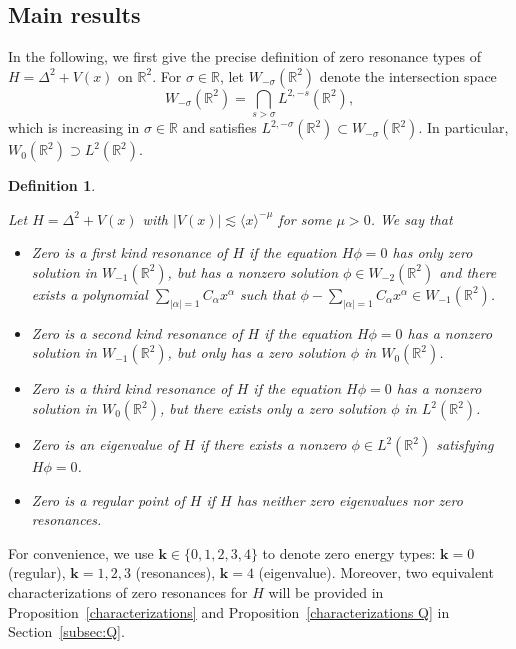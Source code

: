 \documentclass[reqno]{amsart}
\newtheorem{definition}[theorem]{Definition}
\newcommand\R{\mathbb{R}}
\numberwithin{equation}{section}
\begin{document}
	\subsection{Main results}\label{main result}
  In the following, we first give the precise definition of zero resonance types of $H=\Delta^2+V(x)$ on $\mathbb{R}^2$.
For $\sigma \in \mathbb{R}$, let $W_{-\sigma}\left(\mathbb{R}^2\right)$ denote the intersection space
$$
W_{-\sigma}\left(\mathbb{R}^2\right)=\bigcap_{s>\sigma} L^{2,-s}\left(\mathbb{R}^2\right) ,
$$
which is increasing in $\sigma\in\R$ and satisfies $L^{2,-\sigma}(\mathbb{R}^2) \subset W_{-\sigma}(\mathbb{R}^2)$. In particular, $W_0\left(\mathbb{R}^2\right) \supset L^2\left(\mathbb{R}^2\right)$.
\begin{definition}\label{definition1}
{\rm Let $H = \Delta^2 + V(x)$ with $|V(x)| \lesssim \langle x \rangle^{-\mu}$ for some $\mu > 0$. We say that
\begin{itemize}
\item[(i)] Zero is a {\it first kind resonance}  of $H$ if the equation $H\phi = 0$  has only zero solution  in $W_{-1}(\mathbb{R}^2)$, but has a nonzero solution  $\phi \in W_{-2}(\mathbb{R}^2)$ and there exists a polynomial $\sum_{|\alpha|=1} C_\alpha x^\alpha$ such that $\phi-\sum_{|\alpha|=1} C_\alpha x^\alpha\in W_{-1}(\mathbb{R}^2)$.  
\vskip0.1cm

\item[(ii)] Zero is a {\it second kind resonance} of $H$ if
the equation $H\phi = 0$ has a nonzero solution  in $W_{-1}(\mathbb{R}^2)$, but only has a zero solution  $\phi$ in $W_{0}(\mathbb{R}^2)$.
\vskip0.1cm

\item[(iii)] Zero is a {\it third kind resonance} of $H$ if the equation $H\phi = 0$ has a nonzero solution  in $W_0(\mathbb{R}^2)$, but there exists only a zero solution  $\phi$ in  $L^2(\mathbb{R}^2)$.

\vskip0.1cm
\item[(iv)] Zero is an \emph{eigenvalue}  of $H$ if there exists a nonzero $\phi \in L^2(\mathbb{R}^2)$ satisfying $H\phi = 0$.
\vskip0.1cm

\item[(v)] Zero is a {\it regular point} of $H$ if $H$ has neither zero eigenvalues nor zero resonances.
		\end{itemize}}
	\end{definition}
For convenience, we use $\mathbf{k} \in \{0,1,2,3,4\}$ to denote zero energy types: $\mathbf{k}=0$ (regular), $\mathbf{k}=1,2,3$ (resonances), $\mathbf{k}=4$ (eigenvalue).
Moreover, two equivalent characterizations of zero resonances for $H$ will be provided in Proposition~\ref{characterizations} and  Proposition~\ref{characterizations Q} in Section~\ref{subsec:Q}.
 
\end{document}
